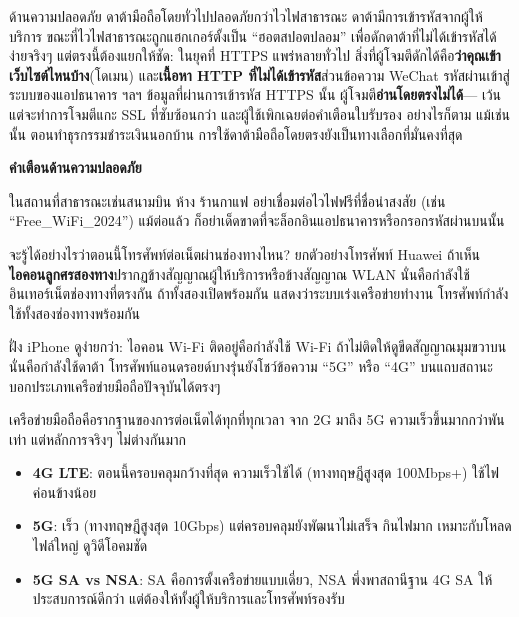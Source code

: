 
ด้านความปลอดภัย ดาต้ามือถือโดยทั่วไปปลอดภัยกว่าไวไฟสาธารณะ ดาต้ามีการเข้ารหัสจากผู้ให้บริการ ขณะที่ไวไฟสาธารณะถูกแฮกเกอร์ตั้งเป็น “ฮอตสปอตปลอม” เพื่อดักดาต้าที่ไม่ได้เข้ารหัสได้ง่ายจริงๆ แต่ตรงนี้ต้องแยกให้ชัด: ในยุคที่ HTTPS แพร่หลายทั่วไป สิ่งที่ผู้โจมตีดักได้คือ\textbf{ว่าคุณเข้าเว็บไซต์ไหนบ้าง}(โดเมน) และ\textbf{เนื้อหา HTTP ที่ไม่ได้เข้ารหัส}ส่วนข้อความ WeChat รหัสผ่านเข้าสู่ระบบของแอปธนาคาร ฯลฯ ข้อมูลที่ผ่านการเข้ารหัส HTTPS นั้น ผู้โจมตี\textbf{อ่านโดยตรงไม่ได้}— เว้นแต่จะทำการโจมตีแกะ SSL ที่ซับซ้อนกว่า และผู้ใช้เพิกเฉยต่อคำเตือนใบรับรอง อย่างไรก็ตาม แม้เช่นนั้น ตอนทำธุรกรรมชำระเงินนอกบ้าน การใช้ดาต้ามือถือโดยตรงยังเป็นทางเลือกที่มั่นคงที่สุด

\textbf{คำเตือนด้านความปลอดภัย}\par

ในสถานที่สาธารณะเช่นสนามบิน ห้าง ร้านกาแฟ อย่าเชื่อมต่อไวไฟฟรีที่ชื่อน่าสงสัย (เช่น “Free\_WiFi\_2024”) แม้ต่อแล้ว ก็อย่าเด็ดขาดที่จะล็อกอินแอปธนาคารหรือกรอกรหัสผ่านบนนั้น


จะรู้ได้อย่างไรว่าตอนนี้โทรศัพท์ต่อเน็ตผ่านช่องทางไหน? ยกตัวอย่างโทรศัพท์ Huawei ถ้าเห็น\textbf{ไอคอนลูกศรสองทาง}ปรากฏข้างสัญญาณผู้ให้บริการหรือข้างสัญญาณ WLAN นั่นคือกำลังใช้อินเทอร์เน็ตช่องทางที่ตรงกัน ถ้าทั้งสองเปิดพร้อมกัน แสดงว่าระบบเร่งเครือข่ายทำงาน โทรศัพท์กำลังใช้ทั้งสองช่องทางพร้อมกัน

ฝั่ง iPhone ดูง่ายกว่า: ไอคอน Wi-Fi ติดอยู่คือกำลังใช้ Wi-Fi ถ้าไม่ติดให้ดูขีดสัญญาณมุมขวาบน นั่นคือกำลังใช้ดาต้า โทรศัพท์แอนดรอยด์บางรุ่นยังโชว์ข้อความ “5G” หรือ “4G” บนแถบสถานะ บอกประเภทเครือข่ายมือถือปัจจุบันได้ตรงๆ


เครือข่ายมือถือคือรากฐานของการต่อเน็ตได้ทุกที่ทุกเวลา จาก 2G มาถึง 5G ความเร็วขึ้นมากกว่าพันเท่า แต่หลักการจริงๆ ไม่ต่างกันมาก


\begin{itemize}
  \item \textbf{4G LTE}: ตอนนี้ครอบคลุมกว้างที่สุด ความเร็วใช้ได้ (ทางทฤษฎีสูงสุด 100Mbps+) ใช้ไฟค่อนข้างน้อย
  \item \textbf{5G}: เร็ว (ทางทฤษฎีสูงสุด 10Gbps) แต่ครอบคลุมยังพัฒนาไม่เสร็จ กินไฟมาก เหมาะกับโหลดไฟล์ใหญ่ ดูวิดีโอคมชัด
  \item \textbf{5G SA vs NSA}: SA คือการตั้งเครือข่ายแบบเดี่ยว, NSA พึ่งพาสถานีฐาน 4G SA ให้ประสบการณ์ดีกว่า แต่ต้องให้ทั้งผู้ให้บริการและโทรศัพท์รองรับ
\end{itemize}


